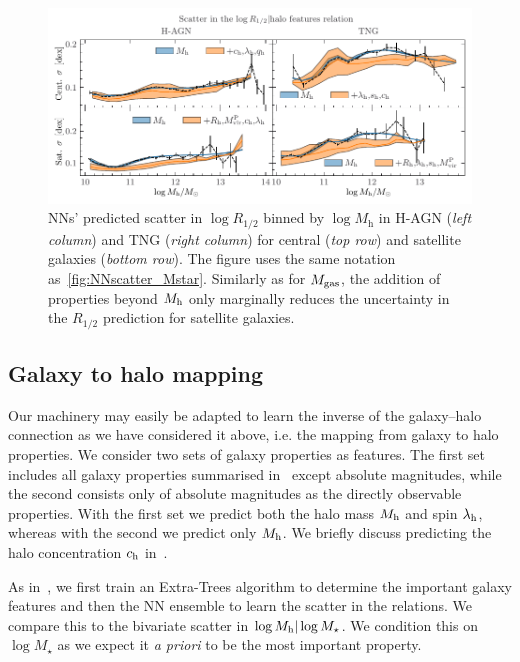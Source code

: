 \documentclass[useAMS,usenatbib]{mnras}
\begin{document}
\begin{figure}
    \centering
    \includegraphics[width=\textwidth]{Figures/NN_scatter_Reff.pdf}
    \caption{\acp{NN}' predicted scatter in $\log R_{1/2}$ binned by $\log M_\mathrm{h}$ in H-AGN (\emph{left column}) and TNG (\emph{right column}) for central (\emph{top row}) and satellite galaxies (\emph{bottom row}). The figure uses the same notation as~\cref{fig:NNscatter_Mstar}. Similarly as for $M_{\rm gas}$, the addition of properties beyond $M_{\rm h}$ only marginally reduces the uncertainty in the $R_{1/2}$ prediction for satellite galaxies.
    }
    \label{fig:NNscatter_Reff}
\end{figure}


\subsection{Galaxy to halo mapping}\label{sec:galaxy_to_halo}

Our machinery may easily be adapted to learn the inverse of the galaxy--halo connection as we have considered it above, i.e. the mapping from galaxy to halo properties. We consider two sets of galaxy properties as features. The first set includes all galaxy properties summarised in~ except absolute magnitudes, while the second consists only of absolute magnitudes as the directly observable properties. With the first set we predict both the halo mass $M_{\rm h}$ and spin $\lambda_{\rm h}$, whereas with the second we predict only $M_{\rm h}$. We briefly discuss predicting the halo concentration $c_{\rm h}$ in~.

As in~, we first train an Extra-Trees algorithm to determine the important galaxy features and then the NN ensemble to learn the scatter in the relations. We compare this to the bivariate scatter in $\log M_{\rm h} | \log M_\star$. We condition this on $\log M_\star$ as we expect it \textit{a priori} to be the most important property.
\end{document}

